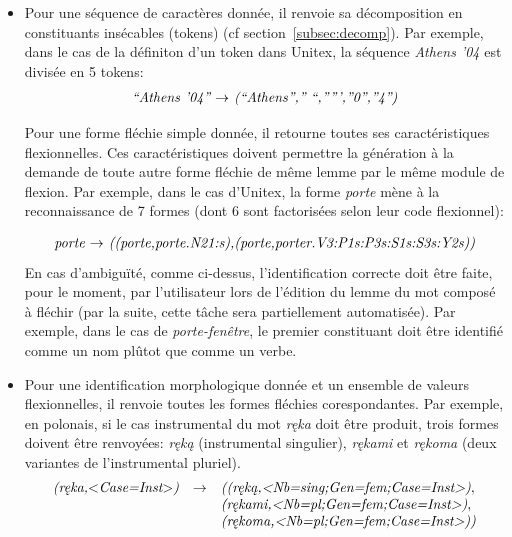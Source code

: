 \begin{itemize}
\item Pour une séquence de caractères donnée, il renvoie sa décomposition en constituants insécables 
(tokens) (cf section~\ref{subsec:decomp}). Par exemple, dans le cas de la définiton d'un token dans
Unitex, la séquence \emph{Athens '04} est divisée en 5 tokens:
\[
\begin{array}[l]{l}
\emph{``Athens '04'' $\rightarrow$ (``Athens'','' ``,''''',''0'',''4'')}
\end{array}
\]

Pour une forme fléchie simple donnée, il retourne toutes ses caractéristiques flexionnelles. Ces
caractéristiques doivent permettre la génération à la demande de toute autre forme fléchie de même
lemme par le même module de flexion.
Par exemple, dans le cas d'Unitex, la forme \emph{porte} mène à  la reconnaissance de 7 formes 
(dont 6 sont factorisées selon leur code flexionnel):

\[
\begin{array}[l]{l}
\emph{porte $\rightarrow$ ((porte,porte.N21:s),(porte,porter.V3:P1s:P3s:S1s:S3s:Y2s))}
\end{array}
\]
En cas d'ambiguïté, comme ci-dessus, l'identification correcte doit être faite, pour le moment,
par l'utilisateur lors de l'édition du lemme du mot composé à fléchir (par la  suite, cette tâche
sera partiellement automatisée). Par exemple, dans le cas de \emph{porte-fenêtre}, le premier
constituant doit être identifié comme un nom plûtot que comme un verbe.

\item Pour une identification morphologique donnée et un ensemble de valeurs flexionnelles, il
renvoie toutes les formes fléchies corespondantes. Par exemple, en polonais, si le cas instrumental
du mot \emph{r\k{e}ka} doit être produit, trois formes doivent être renvoyées: \emph{r\k{e}k\k{a}} 
(instrumental singulier), \emph{r\k{e}kami} et  \emph{r\k{e}koma} (deux variantes de l'instrumental
pluriel).
\[
\begin{array}[l]{lll}
\emph{(r\k{e}ka,$<$Case=Inst$>$)}&  \rightarrow    &
\emph{((r\k{e}k\k{a},<Nb=sing;Gen=fem;Case=Inst>)}, \\
                                    &              & \emph{(r\k{e}kami,<Nb=pl;Gen=fem;Case=Inst>)},
                                    \\
                                    &              & \emph{(r\k{e}koma,<Nb=pl;Gen=fem;Case=Inst>))}
\end{array}
\]
\end{itemize}

